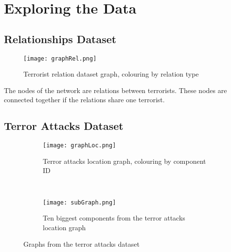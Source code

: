 \section{Exploring the Data}
\label{sec:Exploring the Data}

\subsection{Relationships Dataset}
\label{subsec:Relationships Dataset}

\begin{figure}[H]
\begin{center}

        \texttt{[image: graphRel.png]}
        \label{fig:graphLoc}
        \caption{Terrorist relation dataset graph, colouring by relation type}
        
\end{center}
\end{figure}

The nodes of the network are relations between terrorists. These nodes are connected together if the relations share one terrorist.

\subsection{Terror Attacks Dataset}
\label{subsec:Terror Attacks Dataset}

\begin{figure}[H]
\begin{center}
    \begin{subfigure}[b]{0.45\textwidth}
        \texttt{[image: graphLoc.png]}
        \caption{Terror attacks location graph, colouring by component ID}
        \label{fig:graphLoc}
    \end{subfigure}
    ~
    \begin{subfigure}[b]{0.45\textwidth}
        \texttt{[image: subGraph.png]}
        \caption{Ten biggest components from the terror attacks location graph}
        \label{fig:subGraph}
    \end{subfigure}
\caption{Graphs from the terror attacks dataset}
\label{fig:graphPlots}
\end{center}
\end{figure}

%
%
%
%

